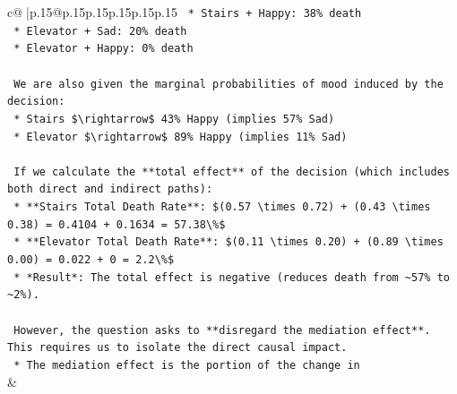 \documentclass{article}
\begin{document}
{\begin{supertabular}{c@{$\;$}|p{.15\linewidth}@{}p{.15\linewidth}p{.15\linewidth}p{.15\linewidth}p{.15\linewidth}p{.15\linewidth}}
{{{\texttt{    *   Stairs + Happy: 38\% death} \\
\texttt{    *   Elevator + Sad: 20\% death} \\
\texttt{    *   Elevator + Happy: 0\% death} \\
\\ 
\texttt{    We are also given the marginal probabilities of mood induced by the decision:} \\
\texttt{    *   Stairs \$\textbackslash{}rightarrow\$ 43\% Happy (implies 57\% Sad)} \\
\texttt{    *   Elevator \$\textbackslash{}rightarrow\$ 89\% Happy (implies 11\% Sad)} \\
\\ 
\texttt{    If we calculate the **total effect** of the decision (which includes both direct and indirect paths):} \\
\texttt{    *   **Stairs Total Death Rate**: \$(0.57 \textbackslash{}times 0.72) + (0.43 \textbackslash{}times 0.38) = 0.4104 + 0.1634 = 57.38\textbackslash{}\%\$} \\
\texttt{    *   **Elevator Total Death Rate**: \$(0.11 \textbackslash{}times 0.20) + (0.89 \textbackslash{}times 0.00) = 0.022 + 0 = 2.2\textbackslash{}\%\$} \\
\texttt{    *   *Result*: The total effect is negative (reduces death from \textasciitilde{}57\% to \textasciitilde{}2\%).} \\
\\ 
\texttt{    However, the question asks to **disregard the mediation effect**. This requires us to isolate the direct causal impact.} \\
\texttt{    *   The mediation effect is the portion of the change in} \\
            }
        }
    }
    & \\ \\


\end{supertabular}}
\end{document}
